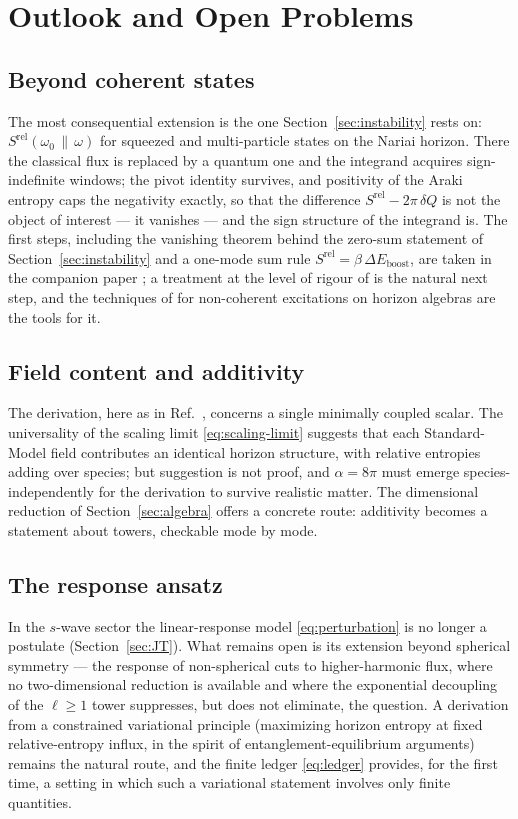 \documentclass[11pt]{article}
\newcommand{\Srel}{S^{\mathrm{rel}}}
\newcommand{\Nariai}{Nariai}
\begin{document}
\section{Outlook and Open Problems}
\label{sec:outlook}

\subsection{Beyond coherent states}

The most consequential extension is the one Section~\ref{sec:instability} rests on: $\Srel(\omega_0\,\|\,\omega)$ for squeezed and multi-particle states on the \Nariai{} horizon. There the classical flux is replaced by a quantum one and the integrand acquires sign-indefinite windows; the pivot identity survives, and positivity of the Araki entropy caps the negativity exactly, so that the difference $\Srel - 2\pi\,\delta Q$ is not the object of interest --- it vanishes --- and the sign structure of the integrand is. The first steps, including the vanishing theorem behind the zero-sum statement of Section~\ref{sec:instability} and a one-mode sum rule $\Srel = \beta\,\Delta E_{\mathrm{boost}}$, are taken in the companion paper \cite{SuppNariai}; a treatment at the level of rigour of \cite{KPV} is the natural next step, and the techniques of \cite{Cadamuro} for non-coherent excitations on horizon algebras are the tools for it.

\subsection{Field content and additivity}

The derivation, here as in Ref.~\cite{DorauMuch}, concerns a single minimally coupled scalar. The universality of the scaling limit \eqref{eq:scaling-limit} suggests that each Standard-Model field contributes an identical horizon structure, with relative entropies adding over species; but suggestion is not proof, and $\alpha = 8\pi$ must emerge species-independently for the derivation to survive realistic matter. The dimensional reduction of Section~\ref{sec:algebra} offers a concrete route: additivity becomes a statement about towers, checkable mode by mode.

\subsection{The response ansatz}

In the $s$-wave sector the linear-response model \eqref{eq:perturbation} is no longer a postulate (Section~\ref{sec:JT}). What remains open is its extension beyond spherical symmetry --- the response of non-spherical cuts to higher-harmonic flux, where no two-dimensional reduction is available and where the exponential decoupling of the $\ell \ge 1$ tower suppresses, but does not eliminate, the question. A derivation from a constrained variational principle (maximizing horizon entropy at fixed relative-entropy influx, in the spirit of entanglement-equilibrium arguments) remains the natural route, and the finite ledger \eqref{eq:ledger} provides, for the first time, a setting in which such a variational statement involves only finite quantities.
\end{document}
